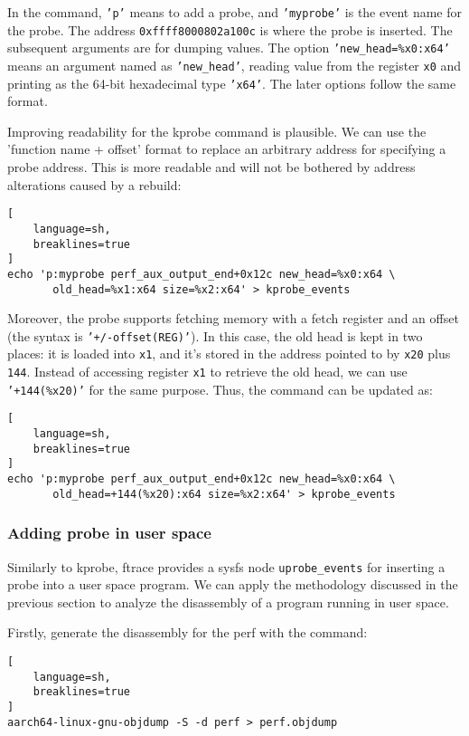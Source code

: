 \documentclass[11pt]{diazessay} %
\def\code#1{\texttt{#1}}
\begin{document}
In the command, \code{'p'} means to add a probe, and \code{'myprobe'} is the
event name for the probe. The address \code{0xffff8000802a100c} is where the
probe is inserted. The subsequent arguments are for dumping values. The option
\code{'new\_head=\%x0:x64'} means an argument named as \code{'new\_head'},
reading value from the register \code{x0} and printing as the 64-bit
hexadecimal type \code{'x64'}. The later options follow the same format.

Improving readability for the kprobe command is plausible. We can use the
'function name + offset' format to replace an arbitrary address for
specifying a probe address. This is more readable and will not be bothered by
address alterations caused by a rebuild:

\begin{lstlisting}[
  	language=sh,
	breaklines=true
]
echo 'p:myprobe perf_aux_output_end+0x12c new_head=%x0:x64 \
       old_head=%x1:x64 size=%x2:x64' > kprobe_events
\end{lstlisting}

Moreover, the probe supports fetching memory with a fetch register and an
offset (the syntax is \code{'+/-offset(REG)'}). In this case, the old head is
kept in two places: it is loaded into \code{x1}, and it's stored in the
address pointed to by \code{x20} plus \code{144}. Instead of accessing
register \code{x1} to retrieve the old head, we can use \code{'+144(\%x20)'}
for the same purpose. Thus, the command can be updated as:

\begin{lstlisting}[
  	language=sh,
	breaklines=true
]
echo 'p:myprobe perf_aux_output_end+0x12c new_head=%x0:x64 \
       old_head=+144(%x20):x64 size=%x2:x64' > kprobe_events
\end{lstlisting}

\subsubsection*{Adding probe in user space}

Similarly to kprobe, ftrace provides a sysfs node \code{uprobe\_events} for
inserting a probe into a user space program. We can apply the methodology
discussed in the previous section to analyze the disassembly of a program
running in user space.

Firstly, generate the disassembly for the perf with the command:

\begin{lstlisting}[
  	language=sh,
	breaklines=true
]
aarch64-linux-gnu-objdump -S -d perf > perf.objdump
\end{lstlisting}
\end{document}
